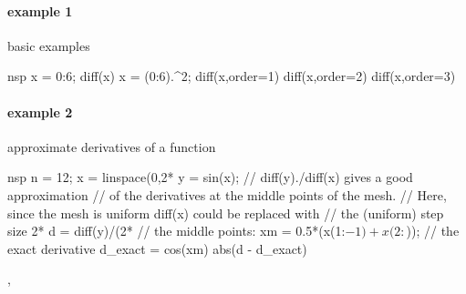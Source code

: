 \begin{examples}
\paragraph{example 1} basic examples
\begin{mintednsp}{nsp}
x = 0:6;
diff(x)
x = (0:6).^2;
diff(x,order=1)
diff(x,order=2)
diff(x,order=3)
\end{mintednsp}

\paragraph{example 2} approximate derivatives of a function
\begin{mintednsp}{nsp}
n = 12;
x = linspace(0,2*%
y = sin(x);
// diff(y)./diff(x) gives a good approximation
// of the derivatives at the middle points of the mesh.
// Here, since the mesh is uniform diff(x) could be replaced with
// the (uniform) step size 2*%
d = diff(y)/(2*%
// the middle points:
xm = 0.5*(x(1:$-1) + x(2:$));
// the exact derivative
d_exact = cos(xm)
abs(d - d_exact)
\end{mintednsp}
\end{examples}

\begin{manseealso}
  , 
\end{manseealso}


